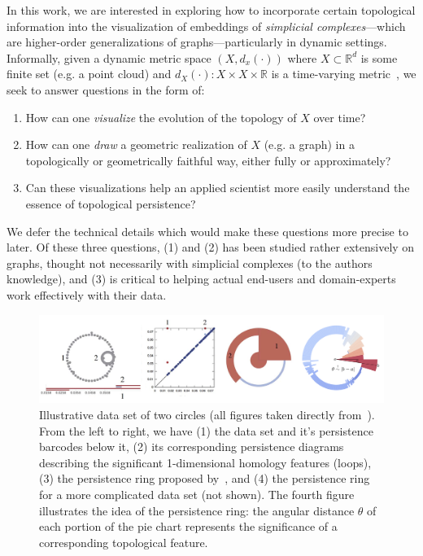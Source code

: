 \documentclass{vgtc}                          %
\begin{document}
In this work, we are interested in exploring how to incorporate certain topological information into the visualization of embeddings of \emph{simplicial complexes}---which are higher-order generalizations of graphs---particularly in dynamic settings. Informally, given a dynamic metric space $(X, d_x(\cdot))$ where $X \subset \mathbb{R}^d$ is some finite set (e.g. a point cloud) and $d_X(\cdot): X \times X \times \mathbb{R}$ is a time-varying metric~\cite{kim2021spatiotemporal}, we seek to answer questions in the form of: 
\begin{enumerate}
    \item How can one \emph{visualize} the evolution of the topology of $X$ over time? 
    \item How can one \emph{draw} a geometric realization of $X$ (e.g. a graph) in a topologically or geometrically faithful way, either fully or approximately?
    \item Can these visualizations help an applied scientist more easily understand the essence of topological persistence? 
\end{enumerate}
We defer the technical details which would make these questions more precise to later. Of these three questions, (1) and  (2) has been studied rather extensively on graphs, thought not necessarily with simplicial complexes (to the authors knowledge), and (3) is critical to helping actual end-users and domain-experts work effectively with their data. 

\begin{figure}[ht]
    \includegraphics[width=\textwidth]{persistence_ring}
    \caption{Illustrative data set of two circles (all figures taken directly  from~\cite{rieck2012multivariate}). From the left to right, we have (1) the data set and it's persistence barcodes below it, (2) its corresponding persistence diagrams describing the significant 1-dimensional homology features (loops), (3) the persistence ring proposed by~\cite{rieck2012multivariate}, and (4) the persistence ring for a more complicated data set (not shown). The fourth figure illustrates the idea of the persistence ring: the angular distance $\theta$ of each portion of the pie chart represents the significance of a corresponding topological feature.}
    \label{fig:p_ring}
\end{figure}
\end{document}
